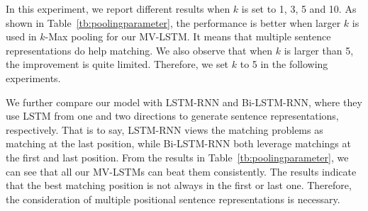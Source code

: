 \documentclass[letterpaper]{article}
\begin{document}
In this experiment, we report different results when $k$ is set to 1, 3, 5 and 10. As shown in Table~\ref{tb:poolingparameter},  the performance is better when larger $k$ is used in $k$-Max pooling for our MV-LSTM. It means that multiple sentence representations do help matching. We also observe that when $k$ is larger than 5, the improvement is quite limited. Therefore, we set $k$ to 5 in the following experiments.

We further compare our model with LSTM-RNN and Bi-LSTM-RNN, where they use LSTM from one and two directions to generate sentence representations, respectively. That is to say, LSTM-RNN views the matching problems as matching at the last position, while Bi-LSTM-RNN both leverage matchings at the first and last position. From the results in Table~\ref{tb:poolingparameter}, we can see that all our MV-LSTMs can beat them consistently. The results indicate that the best matching position is not always in the first or last one. Therefore, the consideration of multiple positional sentence representations is necessary.
\end{document}
